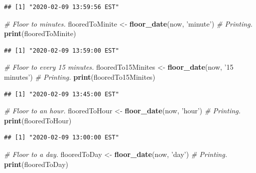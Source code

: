 \documentclass[]{book}
\newenvironment{Shaded}{\begin{snugshade}}{\end{snugshade}}
\newcommand{\CommentTok}[1]{\textcolor[rgb]{0.56,0.35,0.01}{\textit{#1}}}
\newcommand{\KeywordTok}[1]{\textcolor[rgb]{0.13,0.29,0.53}{\textbf{#1}}}
\newcommand{\NormalTok}[1]{#1}
\newcommand{\StringTok}[1]{\textcolor[rgb]{0.31,0.60,0.02}{#1}}
\begin{document}
\begin{verbatim}
## [1] "2020-02-09 13:59:56 EST"
\end{verbatim}

\begin{Shaded}
\begin{Highlighting}[]
\CommentTok{# Floor to minutes.}
\NormalTok{flooredToMinite <-}\StringTok{ }\KeywordTok{floor_date}\NormalTok{(now, }\StringTok{'minute'}\NormalTok{)}
\CommentTok{# Printing.}
\KeywordTok{print}\NormalTok{(flooredToMinite)}
\end{Highlighting}
\end{Shaded}

\begin{verbatim}
## [1] "2020-02-09 13:59:00 EST"
\end{verbatim}

\begin{Shaded}
\begin{Highlighting}[]
\CommentTok{# Floor to every 15 minutes.}
\NormalTok{flooredTo15Minites <-}\StringTok{ }\KeywordTok{floor_date}\NormalTok{(now, }\StringTok{'15 minutes'}\NormalTok{)}
\CommentTok{# Printing.}
\KeywordTok{print}\NormalTok{(flooredTo15Minites)}
\end{Highlighting}
\end{Shaded}

\begin{verbatim}
## [1] "2020-02-09 13:45:00 EST"
\end{verbatim}

\begin{Shaded}
\begin{Highlighting}[]
\CommentTok{# Floor to an hour.}
\NormalTok{flooredToHour <-}\StringTok{ }\KeywordTok{floor_date}\NormalTok{(now, }\StringTok{'hour'}\NormalTok{)}
\CommentTok{# Printing.}
\KeywordTok{print}\NormalTok{(flooredToHour)}
\end{Highlighting}
\end{Shaded}

\begin{verbatim}
## [1] "2020-02-09 13:00:00 EST"
\end{verbatim}

\begin{Shaded}
\begin{Highlighting}[]
\CommentTok{# Floor to a day.}
\NormalTok{flooredToDay <-}\StringTok{ }\KeywordTok{floor_date}\NormalTok{(now, }\StringTok{'day'}\NormalTok{)}
\CommentTok{# Printing.}
\KeywordTok{print}\NormalTok{(flooredToDay)}
\end{Highlighting}
\end{Shaded}
\end{document}
